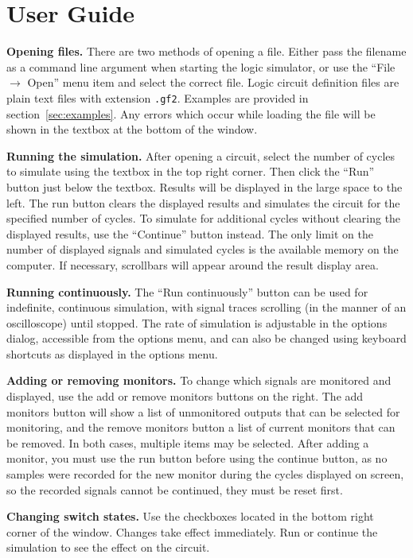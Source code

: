 \documentclass[a4paper,10pt]{article}
\begin{document}
\clearpage
\section{User Guide}
\label{sec:guide}
\textbf{Opening files.} There are two methods of opening a file. Either pass the filename as a command line argument when starting the logic simulator, or use the ``File $\rightarrow$ Open'' menu item and select the correct file. Logic circuit definition files are plain text files with extension \texttt{.gf2}. Examples are provided in section~\ref{sec:examples}. Any errors which occur while loading the file will be shown in the textbox at the bottom of the window.

\textbf{Running the simulation.} After opening a circuit, select the number of cycles to simulate using the textbox in the top right corner. Then click the ``Run'' button just below the textbox. Results will be displayed in the large space to the left. The run button clears the displayed results and simulates the circuit for the specified number of cycles. To simulate for additional cycles without clearing the displayed results, use the ``Continue'' button instead. The only limit on the number of displayed signals and simulated cycles is the available memory on the computer.  If necessary, scrollbars will appear around the result display area. 

\textbf{Running continuously.} The ``Run continuously'' button can be used for indefinite, continuous simulation, with signal traces scrolling (in the manner of an oscilloscope) until stopped. The rate of simulation is adjustable in the options dialog, accessible from the options menu, and can also be changed using keyboard shortcuts as displayed in the options menu. 

\textbf{Adding or removing monitors.} To change which signals are monitored and displayed, use the add or remove monitors buttons on the right. The add monitors button will show a list of unmonitored outputs that can be selected for monitoring, and the remove monitors button a list of current monitors that can be removed. In both cases, multiple items may be selected. After adding a monitor, you must use the run button before using the continue button, as no samples were recorded for the new monitor during the cycles displayed on screen, so the recorded signals cannot be continued, they must be reset first. 

\textbf{Changing switch states.} Use the checkboxes located in the bottom right corner of the window. Changes take effect immediately. Run or continue the simulation to see the effect on the circuit. 
\end{document}
